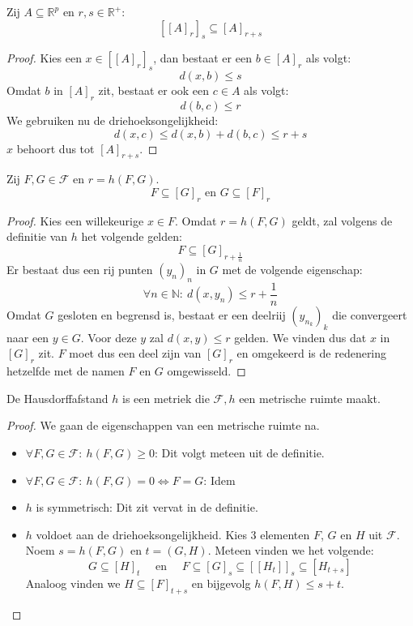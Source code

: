 \documentclass[main.tex]{subfiles}
\begin{document}
\begin{blem}
  Zij $A \subseteq \mathbb{R}^{p}$ en $r,s\in\mathbb{R}^{+}$:
  \[ \left[ [A]_{r}\right]_{s} \subseteq [A]_{r+s} \]

  \begin{proof}
    Kies een $x\in \left[[A]_{r}\right]_{s}$, dan bestaat er een $b\in [A]_{r}$ als volgt:
    \[ d(x,b) \le s \]
    Omdat $b$ in $[A]_{r}$ zit, bestaat er ook een $c\in A$ als volgt:
    \[ d(b,c) \le r \]
    We gebruiken nu de driehoeksongelijkheid:
    \[ d(x,c) \le d(x,b) + d(b,c) \le r + s \]
    $x$ behoort dus tot $[A]_{r+s}$.
  \end{proof}
\end{blem}

\begin{blem}
  Zij $F,G \in \mathcal{F}$ en $r=h(F,G)$.
  \[ F \subseteq [G]_{r} \text{ en } G \subseteq [F]_{r} \]

  \begin{proof}
    Kies een willekeurige $x\in F$.
    Omdat $r = h(F,G)$ geldt, zal volgens de definitie van $h$ het volgende gelden:
    \[ F \subseteq [G]_{r+\frac{1}{n}}\]
    Er bestaat dus een rij punten $(y_{n})_{n}$ in $G$ met de volgende eigenschap:
    \[ \forall n \in \mathbb{N}:\ d(x,y_{n}) \le r + \frac{1}{n} \]
    Omdat $G$ gesloten en begrensd is, bestaat er een deelriij $(y_{n_{k}})_{k}$ die convergeert naar een $y\in G$.
    Voor deze $y$ zal $d(x,y) \le r$ gelden.
    We vinden dus dat $x$ in $[G]_{r}$ zit.
    $F$ moet dus een deel zijn van $[G]_{r}$ en omgekeerd is de redenering hetzelfde met de namen $F$ en $G$ omgewisseld.
  \end{proof}
\end{blem}

\begin{pr}
  De Hausdorffafstand $h$ is een metriek die $\mathcal{F},h$ een metrische ruimte maakt.

  \begin{proof}
    We gaan de eigenschappen van een metrische ruimte na.
    \begin{itemize}
    \item $\forall F,G\in \mathcal{F}:\ h(F,G) \ge 0$: Dit volgt meteen uit de definitie.
    \item $\forall F,G\in \mathcal{F}:\ h(F,G) = 0 \Leftrightarrow F = G$: Idem
    \item $h$ is symmetrisch: Dit zit vervat in de definitie.
    \item $h$ voldoet aan de driehoeksongelijkheid.
      Kies 3 elementen $F$, $G$ en $H$ uit $\mathcal{F}$.
      Noem $s=h(F,G)$ en $t=(G,H)$.
      Meteen vinden we het volgende:
      \[ G \subseteq [H]_{t} \quad\text{ en }\quad F \subseteq [G]_{s} \subseteq \left[[H_{t}]\right]_{s} \subseteq [H_{t+s}] \]
      Analoog vinden we $H \subseteq [F]_{t+s}$ en bijgevolg $h(F,H) \le s+t$.\needed
    \end{itemize}
  \end{proof}
\end{pr}
\end{document}
